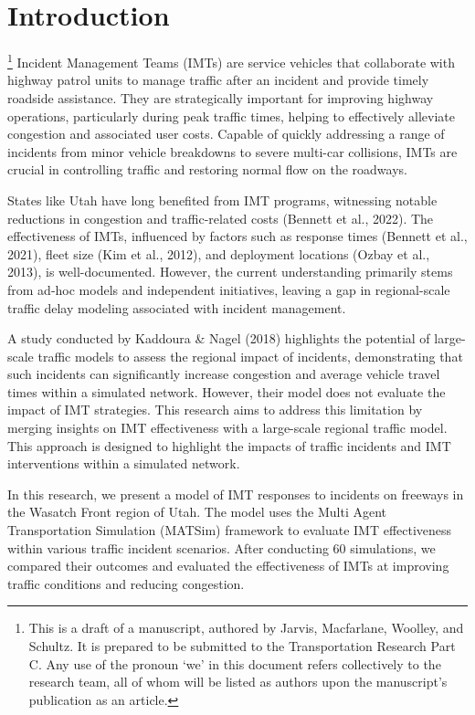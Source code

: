 \documentclass[fancy, oneside, mastersfancy, ms]{byuthesis}
\begin{document}
\hypertarget{introduction}{%
\chapter{Introduction}\label{introduction}}

\footnote{This is a draft of a manuscript, authored by Jarvis,
  Macfarlane, Woolley, and Schultz. It is prepared to be submitted to
  the Transportation Research Part C. Any use of the pronoun `we' in
  this document refers collectively to the research team, all of whom
  will be listed as authors upon the manuscript's publication as an
  article.} Incident Management Teams (IMTs) are service vehicles that
collaborate with highway patrol units to manage traffic after an
incident and provide timely roadside assistance. They are strategically
important for improving highway operations, particularly during peak
traffic times, helping to effectively alleviate congestion and
associated user costs. Capable of quickly addressing a range of
incidents from minor vehicle breakdowns to severe multi-car collisions,
IMTs are crucial in controlling traffic and restoring normal flow on the
roadways.

States like Utah have long benefited from IMT programs, witnessing
notable reductions in congestion and traffic-related costs (Bennett et
al., 2022). The effectiveness of IMTs, influenced by factors such as
response times (Bennett et al., 2021), fleet size (Kim et al., 2012),
and deployment locations (Ozbay et al., 2013), is well-documented.
However, the current understanding primarily stems from ad-hoc models
and independent initiatives, leaving a gap in regional-scale traffic
delay modeling associated with incident management.

A study conducted by Kaddoura \& Nagel (2018) highlights the potential
of large-scale traffic models to assess the regional impact of
incidents, demonstrating that such incidents can significantly increase
congestion and average vehicle travel times within a simulated network.
However, their model does not evaluate the impact of IMT strategies.
This research aims to address this limitation by merging insights on IMT
effectiveness with a large-scale regional traffic model. This approach
is designed to highlight the impacts of traffic incidents and IMT
interventions within a simulated network.

In this research, we present a model of IMT responses to incidents on
freeways in the Wasatch Front region of Utah. The model uses the Multi
Agent Transportation Simulation (MATSim) framework to evaluate IMT
effectiveness within various traffic incident scenarios. After
conducting 60 simulations, we compared their outcomes and evaluated the
effectiveness of IMTs at improving traffic conditions and reducing
congestion.
\end{document}
